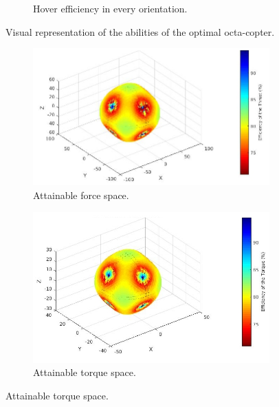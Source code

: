 \begin{figure}[!ht]
\begin{center}
\begin{subfigure}[b]{0.45\textwidth}
    \caption{Hover efficiency in every orientation.} \label{fig:Octa_hspace}
  \end{subfigure}
  \caption{Visual representation of the abilities of the optimal octa-copter.}
  \label{fig:Octacopter_spaces}
  \end{center}
\end{figure}

\begin{figure}[!ht]
  \begin{center}
  \begin{subfigure}[b]{0.48\textwidth}
    \includegraphics[width=\linewidth]{images/Omnicopter_fspace.jpg}
    \caption{Attainable force space.} \label{fig:Omnicopter_fspace}
  \end{subfigure}
  \hspace*{\fill} %
  \begin{subfigure}[b]{0.45\textwidth}
    \includegraphics[width=\linewidth]{images/Omnicopter_tspace.jpg}
    \caption{Attainable torque space.} \label{fig:Omnicopter_tspace}

\end{subfigure}
\end{center}
\end{figure}
